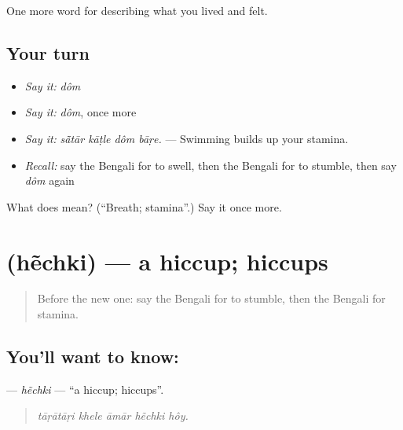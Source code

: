 \begin{grammarlens}[title={What you've built}]
One more word for describing what you lived and felt.
\end{grammarlens}

\subsection*{Your turn}
\begin{itemize}
\raggedright
  \item \emph{Say it:} \emph{dôm}
  \item \emph{Say it:} \emph{dôm}, once more
  \item \emph{Say it:} \emph{sā̃tār kāṭle dôm bāṛe.} — Swimming builds up your stamina.
  \item \emph{Recall:} say the Bengali for to swell, then the Bengali for to stumble, then say \emph{dôm} again
\end{itemize}

\begin{tcolorbox}[breakable,colback=teal!4,colframe=teal!35!black,title={Before you move on}]
What does  mean? (\textquotedblleft{}Breath; stamina\textquotedblright{}.) Say it once more.
\end{tcolorbox}
\section[\texorpdfstring{\bn{হেঁচকি} (hẽchki)}{হেঁচকি (hẽchki)}]{ (hẽchki) — a hiccup; hiccups}

\label{lesson:BN-C476-hechki}



\begin{quote}
Before the new one: say the Bengali for to stumble, then the Bengali for stamina.
\end{quote}

\subsection*{You'll want to know: }
\textbf{} — \emph{hẽchki} — \textquotedblleft{}a hiccup; hiccups\textquotedblright{}.

\begin{quote}
    
\end{quote}

\begin{quote}
\emph{tāṛātāṛi khele āmār hẽchki hôy.}
\end{quote}

